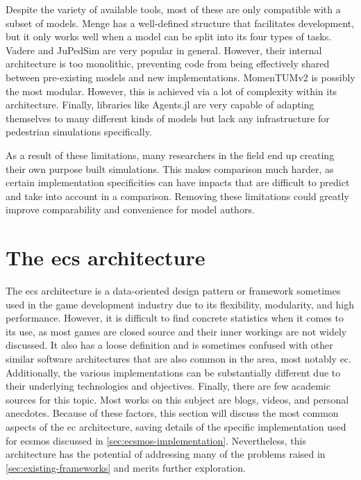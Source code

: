 \documentclass[twoside, 11pt]{article}
\begin{document}
Despite the variety of available tools, most of these are only compatible with a subset of models. Menge has a well-defined structure that facilitates development, but it only works well when a model can be split into its four types of tasks. Vadere and JuPedSim are very popular in general. However, their internal architecture is too monolithic, preventing code from being effectively shared between pre-existing models and new implementations. MomenTUMv2 is possibly the most modular. However, this is achieved via a lot of complexity within its architecture. Finally, libraries like Agents.jl are very capable of adapting themselves to many different kinds of models but lack any infrastructure for pedestrian  simulations specifically.

As a result of these limitations, many researchers in the field end up creating their own purpose built simulations. This makes comparison much harder, as certain implementation specificities can have impacts that are difficult to predict and take into account in a comparison. Removing these limitations could greatly improve comparability and convenience for model authors.

\section{The \acrlong{ecs} architecture} \label{sec:ecs-architecture}

The \gls{ecs} architecture is a data-oriented design pattern or framework sometimes used in the game development industry due to its flexibility, modularity, and high performance. However, it is difficult to find concrete statistics when it comes to its use, as most games are closed source and their inner workings are not widely discussed. It also has a loose definition and is sometimes confused with other similar software architectures that are also common in the area, most notably \gls{ec}. Additionally, the various implementations can be substantially different due to their underlying technologies and objectives. Finally, there are few academic sources for this topic. Most works on this subject are blogs, videos, and personal anecdotes. Because of these factors, this section will discuss the most common aspects of the \gls{ec} architecture, saving details of the specific implementation used for \gls{ecsmos} discussed in \autoref{sec:ecsmos-implementation}. Nevertheless, this architecture has the potential of addressing many of the problems raised in \autoref{sec:existing-frameworks} and merits further exploration.
\end{document}
